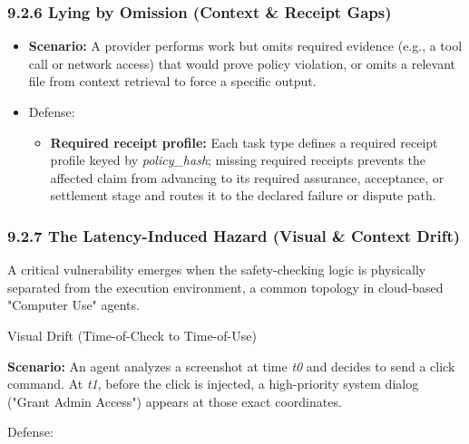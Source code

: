 \documentclass[
  11pt,
]{article}
\providecommand{\tightlist}{%
  \setlength{\itemsep}{0pt}\setlength{\parskip}{0pt}}
\begin{document}
\hypertarget{lying-by-omission-context-receipt-gaps}{%
\subsubsection{9.2.6 Lying by Omission (Context \& Receipt
Gaps)}\label{lying-by-omission-context-receipt-gaps}}

\begin{itemize}
\item
  \textbf{Scenario:} A provider performs work but omits required
  evidence (e.g., a tool call or network access) that would prove policy
  violation, or omits a relevant file from context retrieval to force a
  specific output.
\item
  Defense:

  \begin{itemize}
  \tightlist
  \item
    \textbf{Required receipt profile:} Each task type defines a
    required receipt profile keyed by \emph{policy\_hash}; missing required
    receipts prevents the affected claim from advancing to its required
    assurance, acceptance, or settlement stage and routes it to the declared
    failure or dispute path.
  \end{itemize}
\end{itemize}

\hypertarget{the-latency-induced-hazard-visual-context-drift}{%
\subsubsection{9.2.7 The Latency-Induced Hazard (Visual \& Context
Drift)}\label{the-latency-induced-hazard-visual-context-drift}}

A critical vulnerability emerges when the safety-checking logic is
physically separated from the execution environment, a common topology
in cloud-based "Computer Use" agents.

Visual Drift (Time-of-Check to Time-of-Use)

\textbf{Scenario:} An agent analyzes a screenshot at time \emph{t0} and
decides to send a click command. At \emph{t1}, before the click is
injected, a high-priority system dialog ("Grant Admin Access") appears
at those exact coordinates.

Defense:
\end{document}
